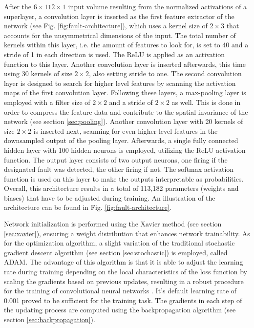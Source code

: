After the \(6 \times 112 \times 1\) input volume resulting from the
normalized activations of a superlayer, a convolution layer
is inserted as the first feature extractor of the network (see
Fig. \ref{fig:fault-architecture}), which
uses a kernel size of \(2 \times 3\) that accounts for the
unsymmetrical dimensions of the input. The total number of kernels
within this layer, i.e. the amount of features to look for, is set to
40 and a stride of 1 in each direction is used. The ReLU is applied
as an activation function to this layer. Another convolution layer is
inserted afterwards, this time using 30 kernels of size \(2 \times
2\), also setting stride to one. The second convolution layer is
designed to search for higher level features by scanning the
activation maps of the first convolution layer.
Following these layers, a max-pooling layer is
employed with a filter size of \(2 \times 2\) and a stride of \(2
\times 2\) as well. This is done in order to compress the feature data
and contribute to the spatial invariance of the network (see section
\ref{sec:pooling}). Another convolution layer with 20
kernels of size \(2 \times 2\) is inserted next, scanning for even
higher level features in the downsampled output of the pooling
layer. Afterwards, a single fully
connected hidden layer with 100 hidden neurons is employed, utilizing
the ReLU activation function. The output layer consists of two
output neurons, one firing if the designated fault was detected, the
other firing if not. The softmax activation function is used on this
layer to make the outputs interpretable as probabilities. Overall, this
architecture results in a total of 113,182 parameters (weights and
biases) that have to be adjusted during training. An illustration of
the architecture can be found in Fig. \ref{fig:fault-architecture}.

Network initialization is performed using the Xavier
method (see section \ref{sec:xavier}), ensuring a weight distribution
that enhances network trainability. As for the optimization algorithm,
a slight variation of the traditional stochastic gradient
descent algorithm (see section \ref{sec:stochastic}) is employed,
called ADAM. The advantage of this algorithm is that it is able to
adjust the learning rate during training depending on the local
characteristics of the loss function by scaling the gradients based on
previous updates, resulting in a robust procedure for the training of
convolutional neural networks \cite{adam}. It's default learning rate
of 0.001 proved to be sufficient for the training task. The gradients
in each step of the updating process are computed using the
backpropagation algorithm (see section \ref{sec:backpropagation}).

